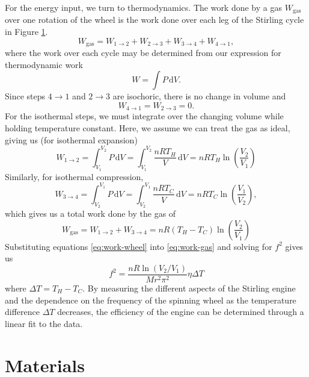 \documentclass{article}
\begin{document}
For the energy input, we turn to thermodynamics. The work done by a gas $W_\mathrm{gas}$ over one rotation of the wheel is the work done over each leg of the Stirling cycle in Figure \ref{}.
\begin{equation*}
    W_\mathrm{gas} = W_{1\rightarrow 2} + W_{2\rightarrow 3} + W_{3\rightarrow 4} + W_{4\rightarrow 1},
\end{equation*}
where the work over each cycle may be determined from our expression for thermodynamic work
\begin{equation}
    W = \int P\, \mathrm{d}V.
\end{equation}
Since steps $4\rightarrow 1$ and $2\rightarrow 3$ are isochoric, there is no change in volume and 
\begin{equation*}
    W_{4\rightarrow 1} = W_{2\rightarrow 3} = 0.
\end{equation*}
For the isothermal steps, we must integrate over the changing volume while holding temperature constant. Here, we assume we can treat the gas as ideal, giving us (for isothermal expansion)
\begin{equation}
    W_{1\rightarrow 2} = \int_{V_1}^{V_2} P\, \mathrm{d}V = \int_{V_1}^{V_2} \frac{n R T_H}{V}\, \mathrm{d}V = nRT_H \ln \left( \frac{V_2}{V_1}\right) 
\end{equation}
Similarly, for isothermal compression, 
\begin{equation}
    W_{3\rightarrow 4} = \int_{V_2}^{V_1} P\, \mathrm{d}V = \int_{V_2}^{V_1} \frac{n R T_C}{V}\, \mathrm{d}V = nRT_C \ln \left( \frac{V_1}{V_2}\right),
\end{equation}
which gives us a total work done by the gas of
\begin{equation}
    W_\mathrm{gas} = W_{1\rightarrow 2} + W_{3\rightarrow 4} = n R \left(T_H - T_C \right)\ln \left(\frac{V_2}{V_1}\right)
    \label{eq:work-gas}
\end{equation}
Substituting equations \eqref{eq:work-wheel} into \eqref{eq:work-gas} and solving for $f^2$ gives us
\begin{equation}
    f^2 = \frac{nR\ln\left(V_2/V_1\right)}{M r^2 \pi^2}\eta \Delta T
    \label{eq:freq2}
\end{equation}
where $\Delta T = T_H - T_C$. By measuring the different aspects of the Stirling engine and the dependence on the frequency of the spinning wheel as the temperature difference $\Delta T$ decreases, the efficiency of the engine can be determined through a linear fit to the data.
\section{Materials}
\end{document}
